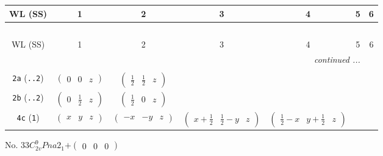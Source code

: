 \documentclass[fleqn,9pt,landscape]{jsarticle}
\begin{document}
\begin{center}
\renewcommand{\arraystretch}{1.2}
\begin{longtable}{ccccccc}
 \hline \hline
WL (SS) & 1 & 2 & 3 & 4 & 5 & 6 \\ \hline \endfirsthead

\multicolumn{6}{l}{\tablename\ \thetable{}} \\
 \hline \hline
WL (SS) & 1 & 2 & 3 & 4 & 5 & 6 \\ \hline \endhead

 \hline \hline
\multicolumn{6}{r}{\footnotesize\it continued ...} \\ \endfoot

 \hline \hline
\multicolumn{6}{r}{} \\ \endlastfoot

{\tt 2a} ({\tt ..2}) & $ \begin{pmatrix} 0 & 0 & z \end{pmatrix} $ & $ \begin{pmatrix} \frac{1}{2} & \frac{1}{2} & z \end{pmatrix} $ & $  $ & $  $ \\ \hline
{\tt 2b} ({\tt ..2}) & $ \begin{pmatrix} 0 & \frac{1}{2} & z \end{pmatrix} $ & $ \begin{pmatrix} \frac{1}{2} & 0 & z \end{pmatrix} $ & $  $ & $  $ \\ \hline
{\tt 4c} ({\tt 1}) & $ \begin{pmatrix} x & y & z \end{pmatrix} $ & $ \begin{pmatrix} - x & - y & z \end{pmatrix} $ & $ \begin{pmatrix} x + \frac{1}{2} & \frac{1}{2} - y & z \end{pmatrix} $ & $ \begin{pmatrix} \frac{1}{2} - x & y + \frac{1}{2} & z \end{pmatrix} $ \\
\end{longtable}
\end{center}
\newpage
No. 33\quad$C_{2v}^{9}$\quad$Pna2_1$\quad[ orthorhombic ]\quad$+\begin{pmatrix} 0 & 0 & 0 \end{pmatrix}$
\end{document}

